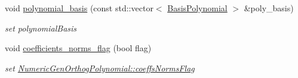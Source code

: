 \begin{DoxyCompactItemize}
\item 
void \hyperlink{classPecos_1_1SharedOrthogPolyApproxData_a1aef6c62d150194806312cbd7f2b5544}{polynomial\+\_\+basis} (const std\+::vector$<$ \hyperlink{classPecos_1_1BasisPolynomial}{Basis\+Polynomial} $>$ \&poly\+\_\+basis)\label{classPecos_1_1SharedOrthogPolyApproxData_a1aef6c62d150194806312cbd7f2b5544}

\begin{DoxyCompactList}\small\item\em set polynomial\+Basis \end{DoxyCompactList}\item 
void \hyperlink{classPecos_1_1SharedOrthogPolyApproxData_a738108531d8a83dd1a9c6021c76e6bee}{coefficients\+\_\+norms\+\_\+flag} (bool flag)\label{classPecos_1_1SharedOrthogPolyApproxData_a738108531d8a83dd1a9c6021c76e6bee}

\begin{DoxyCompactList}\small\item\em set \hyperlink{classPecos_1_1NumericGenOrthogPolynomial_a216f184d63de7370a1a674f4b1b7728d}{Numeric\+Gen\+Orthog\+Polynomial\+::coeffs\+Norms\+Flag} \end{DoxyCompactList}\end{DoxyCompactItemize}

